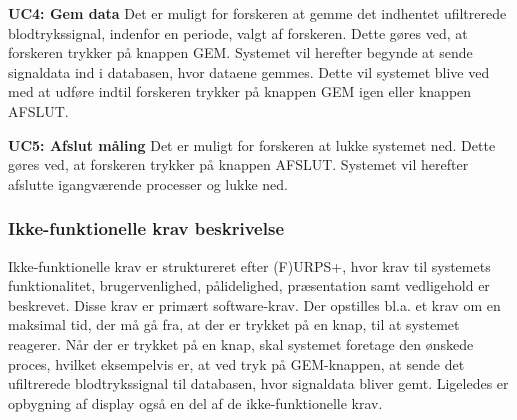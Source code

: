 \textbf{UC4: Gem data}
Det er muligt for forskeren at gemme det indhentet ufiltrerede blodtrykssignal, indenfor en periode, valgt af forskeren. Dette gøres ved, at forskeren trykker på knappen GEM. Systemet vil herefter begynde at sende signaldata ind i databasen, hvor dataene gemmes. Dette vil systemet blive ved med at udføre indtil forskeren trykker på knappen GEM igen eller knappen AFSLUT.  

\textbf{UC5: Afslut måling}
Det er muligt for forskeren at lukke systemet ned. Dette gøres ved, at forskeren trykker på knappen AFSLUT. Systemet vil herefter afslutte igangværende processer og lukke ned.

\subsubsection{Ikke-funktionelle krav beskrivelse}
Ikke-funktionelle krav er struktureret efter (F)URPS+, hvor krav til systemets funktionalitet, brugervenlighed, pålidelighed, præsentation samt vedligehold er beskrevet. Disse krav er primært software-krav. Der opstilles bl.a. et krav om en maksimal tid, der må gå fra, at der er trykket på en knap, til at systemet reagerer. Når der er trykket på en knap, skal systemet foretage den ønskede proces, hvilket eksempelvis er, at ved tryk på GEM-knappen, at sende det ufiltrerede blodtrykssignal til databasen, hvor signaldata bliver gemt. Ligeledes er opbygning af display også en del af de ikke-funktionelle krav.
